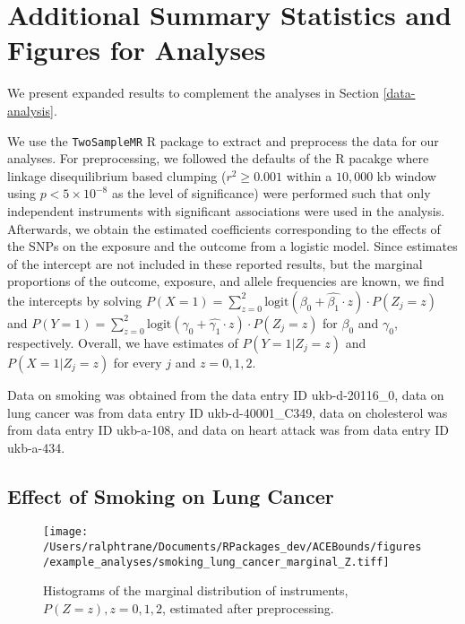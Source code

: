 \documentclass[AMA,STIX1COL,]{WileyNJD-v2}
\begin{document}
\hypertarget{additional-summary-statistics-and-figures-for-analyses}{%
\section{Additional Summary Statistics and Figures for
Analyses}\label{additional-summary-statistics-and-figures-for-analyses}}

\label{more-details-data-application-appendix}

We present expanded results to complement the analyses in Section
\ref{data-analysis}.

We use the \texttt{TwoSampleMR} R package \citep{mrbase} to extract and
preprocess the data for our analyses. For preprocessing, we followed the
defaults of the R pacakge where linkage disequilibrium based clumping
(\(r^2 \ge 0.001\) within a \(10,000\) kb window using
\(p < 5 \times 10^{-8}\) as the level of significance) were performed
such that only independent instruments with significant associations
were used in the analysis. Afterwards, we obtain the estimated
coefficients corresponding to the effects of the SNPs on the exposure
and the outcome from a logistic model. Since estimates of the intercept
are not included in these reported results, but the marginal proportions
of the outcome, exposure, and allele frequencies are known, we find the
intercepts by solving
\(P(X = 1) = \sum_{z = 0}^2\text{logit}(\beta_0 + \hat{\beta_1}\cdot z)\cdot P(Z_j = z)\)
and
\(P(Y = 1) = \sum_{z = 0}^2\text{logit}(\gamma_0 + \hat{\gamma_1}\cdot z)\cdot P(Z_j = z)\)
for \(\beta_0\) and \(\gamma_0\), respectively. Overall, we have
estimates of \(P(Y = 1 | Z_j = z)\) and \(P(X = 1 | Z_j = z)\) for every
\(j\) and \(z=0,1,2\).

Data on smoking was obtained from the data entry ID ukb-d-20116\_0, data
on lung cancer was from data entry ID ukb-d-40001\_C349, data on
cholesterol was from data entry ID ukb-a-108, and data on heart attack
was from data entry ID ukb-a-434.

\hypertarget{effect-of-smoking-on-lung-cancer}{%
\subsection{\texorpdfstring{Effect of Smoking on Lung Cancer
\label{appendix:smoking-on-lung-cancer}}{Effect of Smoking on Lung Cancer }}\label{effect-of-smoking-on-lung-cancer}}

\begin{figure}[ht]
  \center
  \texttt{[image: /Users/ralphtrane/Documents/RPackages\_dev/ACEBounds/figures/example\_analyses/smoking\_lung\_cancer\_marginal\_Z.tiff]}
  \caption{Histograms of the marginal distribution of instruments, $P(Z = z), z=0,1,2$, estimated after preprocessing.}
  \label{fig:marginal-distribution-of-instruments-lung-cancer}
\end{figure}
\end{document}
